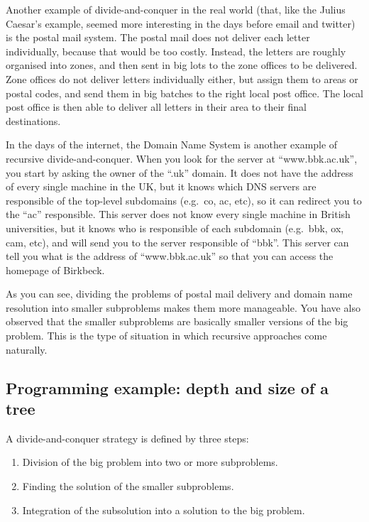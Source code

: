Another example of divide-and-conquer in the real world (that, like
the Julius Caesar's example, seemed more interesting in the days before email
and twitter) is the postal mail system. The postal mail does not
deliver each letter individually, because that would be too
costly. Instead, the letters are roughly organised into zones, and then
sent in big lots to the zone offices to be delivered. Zone offices do not deliver
letters individually either, but assign them to areas or postal codes,
and send them in big batches to the right local post office. The local
post office is then able to deliver all letters in their area to their
final destinations. 

In the days of the internet, the Domain Name System is another example
of recursive divide-and-conquer. When you look for the server at
``www.bbk.ac.uk'', you start by asking the owner of the ``.uk''
domain. It does not have the address of every single machine in the
UK, but it knows which DNS servers are responsible of the top-level
subdomains (e.g.~co, ac, etc), so it can redirect you to the ``ac''
responsible. This server does not know every single machine in British
universities, but it knows who is responsible of each subdomain
(e.g.~bbk, ox, cam, etc), and will send you to the server responsible
of ``bbk''. This server can tell you what is the address of
``www.bbk.ac.uk'' so that you can access the homepage of Birkbeck. 

As you can see, dividing the problems of postal mail delivery and
domain name resolution into smaller subproblems makes them more
manageable. You have also observed that the smaller subproblems are
basically smaller versions of the big problem. This is the type of
situation in which recursive approaches come naturally. 

\subsection{Programming example: depth and size of a tree}
\label{sec:progr-exampl-depth}

A divide-and-conquer strategy is defined by three steps: 

\begin{enumerate}
\item Division of the big problem into two or more subproblems.
\item Finding the solution of the smaller subproblems.
\item Integration of the subsolution into a solution to the big
  problem. 
\end{enumerate}

